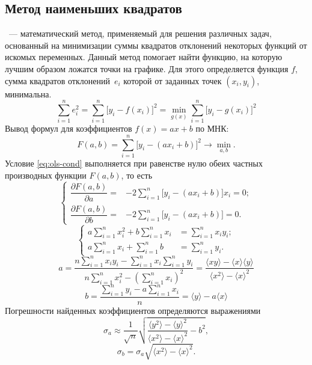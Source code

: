 \subsection{Метод наименьших квадратов}
~--- математический метод, применяемый для решения различных задач, основанный на минимизации суммы квадратов отклонений некоторых функций от искомых переменных. Данный метод помогает найти функцию, на которую лучшим образом ложатся точки на графике. Для этого определяется функция $f$, сумма квадратов отклонений~$e_i$ которой от заданных точек $\left( x_i, y_i \right)$, минимальна.
\begin{equation}
    \sum\limits_{i=1}^n e_i^2 = \sum\limits_{i=1}^n \bigl[ y_i - f(x_i) \bigr]^2 = \min_{g(x)} \sum\limits_{i=1}^n \bigl[y_i - g(x_i) \bigr]^2
    \label{eq:ols-cond}
\end{equation}
Вывод формул для коэффициентов  $f(x) = ax + b$ по МНК:
\begin{equation*}
    F(a,b) = \sum\limits_{i=1}^n \bigl[y_i-(ax_i + b) \bigr]^2 \rightarrow \min_{a, b}.
\end{equation*}
Условие \eqref{eq:ols-cond} выполняется при равенстве нулю обеих частных производных функции $F(a, b)$, то есть
\begin{equation*}
    \left\{
    \begin{aligned}
        \dfrac{\partial  F(a,b)}{\partial a} =& -2\sum\limits_{i=1}^n \bigl[ y_i-(ax_i + b) \bigr] x_i = 0;\\
        \dfrac{\partial  F(a,b)}{\partial b} =& -2\sum\limits_{i=1}^n \bigl[ y_i-(ax_i + b) \bigr] = 0.
    \end{aligned} \right.
\end{equation*}
\begin{equation*}
    \left\{
    \begin{aligned}
        a \sum\limits_{i=1}^n x_i^2 + b \sum\limits_{i=1}^n x_i &= \sum\limits_{i=1}^n x_i y_i;\\
        a\sum\limits_{i=1}^n x_i + \sum\limits_{i=1}^n b &= \sum\limits_{i=1}^n y_i.
    \end{aligned} \right.
\end{equation*}
\begin{equation}
    a = \dfrac{n\sum\limits_{i=1}^n x_i y_i - \sum\limits_{i=1}^n x_i \sum\limits_{i=1}^n y_i}{n \sum\limits_{i=1}^n x_i^2 - \left(\sum\limits_{i=1}^n x_i\right)^2}
    = \dfrac{\langle xy \rangle -\langle x\rangle \langle y \rangle}{\langle x^2 \rangle - \langle x \rangle^2}
\end{equation}
\begin{equation}
    b = \dfrac{\sum\limits_{i=1}^n y_i - a \sum\limits_{i=1}^n x_i}{n}
    = \langle y \rangle - a \langle x \rangle
\end{equation}
Погрешности найденных коэффициентов определяются выражениями
\begin{equation}
    \sigma_a \approx \frac{1}{\sqrt{n}} \sqrt{\dfrac{\langle y^2 \rangle - \langle y \rangle^2}{\langle x^2 \rangle - \langle x \rangle^2} - b^2},
\end{equation}
\begin{equation}
    \sigma_b = \sigma_a \sqrt{\langle x^2 \rangle - \langle x \rangle^2}.
\end{equation}
